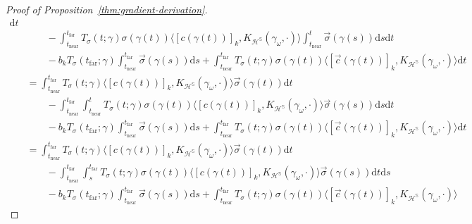 \documentclass{article}
\newcommand{\dif}{\mathrm{d}}
\newcommand{\near}{\mathrm{near}}
\newcommand{\far}{\mathrm{far}}
\begin{document}
\begin{proof}[Proof of Proposition~\ref{thm:gradient-derivation}]
{\begin{align*}
            \dif t
            \\ &\qquad - \int_{t_\near}^{t_\far}
                T_{\sigma}(t;\gamma)
                \sigma(\gamma(t))
                \langle [c(\gamma(t))]_k, K_{\mathcal{H}^\mathbb{S}}(\gamma_\omega, \cdot) \rangle
                \int_{t_\near}^t \vec{\sigma}(\gamma(s)) \dif s
            \dif t
            \\ &\qquad - b_k T_{\sigma}(t_\far;\gamma) \int_{t_\near}^{t_\far} \vec{\sigma}(\gamma(s)) \dif s
            + \int_{t_\near}^{t_\far}
                T_{\sigma}(t;\gamma)
                \sigma(\gamma(t)) \langle [\vec{c}(\gamma(t))]_k, K_{\mathcal{H}^\mathbb{S}}(\gamma_\omega, \cdot) \rangle
            \dif t
        \\ &=
            \int_{t_\near}^{t_\far}
                T_{\sigma}(t;\gamma)
                \langle [c(\gamma(t))]_k, K_{\mathcal{H}^\mathbb{S}}(\gamma_\omega, \cdot) \rangle \vec{\sigma}(\gamma(t))
            \dif t
            \\ &\qquad - \int_{t_\near}^{t_\far} \int_{t_\near}^t
                T_{\sigma}(t;\gamma)
                \sigma(\gamma(t))
                \langle [c(\gamma(t))]_k, K_{\mathcal{H}^\mathbb{S}}(\gamma_\omega, \cdot) \rangle
                \vec{\sigma}(\gamma(s))
            \dif s \dif t
            \\ &\qquad - b_k T_{\sigma}(t_\far;\gamma) \int_{t_\near}^{t_\far} \vec{\sigma}(\gamma(s)) \dif s
            + \int_{t_\near}^{t_\far}
                T_{\sigma}(t;\gamma)
                \sigma(\gamma(t)) \langle [\vec{c}(\gamma(t))]_k, K_{\mathcal{H}^\mathbb{S}}(\gamma_\omega, \cdot) \rangle
            \dif t
        \\ &=
            \int_{t_\near}^{t_\far}
                T_{\sigma}(t;\gamma)
                \langle [c(\gamma(t))]_k, K_{\mathcal{H}^\mathbb{S}}(\gamma_\omega, \cdot) \rangle \vec{\sigma}(\gamma(t))
            \dif t
            \\ &\qquad - \int_{t_\near}^{t_\far} \int_{s}^{t_\far}
                T_{\sigma}(t;\gamma)
                \sigma(\gamma(t))
                \langle [c(\gamma(t))]_k, K_{\mathcal{H}^\mathbb{S}}(\gamma_\omega, \cdot) \rangle
                \vec{\sigma}(\gamma(s))
            \dif t \dif s
            \\ &\qquad - b_k T_{\sigma}(t_\far;\gamma) \int_{t_\near}^{t_\far} \vec{\sigma}(\gamma(s)) \dif s
            + \int_{t_\near}^{t_\far}
                T_{\sigma}(t;\gamma)
                \sigma(\gamma(t)) \langle [\vec{c}(\gamma(t))]_k, K_{\mathcal{H}^\mathbb{S}}(\gamma_\omega, \cdot) \rangle

\end{align*}}
\end{proof}
\end{document}
